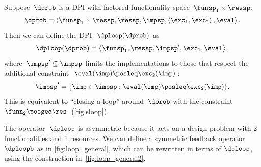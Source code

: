 \begin{definition}[$\dploop$]
\label{def:dp_loop}Suppose~$\dprob$ is a DPI with factored functionality
space~$\funsp_{1}\times\ressp$:
\[
\dprob=\left\langle \funsp_{1}\times\ressp,\ressp,\impsp,\left\langle \exc_{1},\exc_{2}\right\rangle ,\eval\right\rangle .
\]
Then we can define the DPI~$\dploop(\dprob)$ as
\[
\dploop(\dprob)\doteq\left\langle \funsp_{1},\ressp,\impsp',\exc_{1},\eval\right\rangle ,
\]
where~$\impsp'\subseteq\impsp$ limits the implementations to those
that respect the additional constraint~$\eval(\imp)\posleq\exc_{2}(\imp)$:
\[
\impsp'=\{\imp\in\impsp:\eval(\imp)\posleq\exc_{2}(\imp)\}.
\]
This is equivalent to ``closing a loop'' around~$\dprob$ with
the constraint~$\funn_{2}\posgeq\res$~(\cref{fig:sloop}).
\end{definition}


The operator~$\dploop$ is asymmetric because it acts on a design
problem with 2 functionalities and 1 resources. We can define a symmetric
feedback operator $\dploopb$ as in \cref{fig:loop_general}, which
can be rewritten in terms of $\dploop$, using the construction in~\cref{fig:loop_general2}\emph{.}

